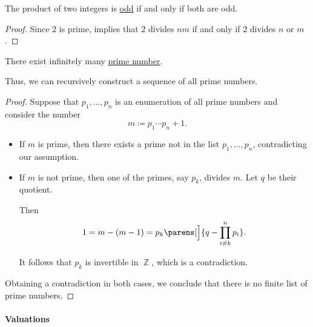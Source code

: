 \begin{corollary}\label{thm:integer_product_parity}
  The product of two integers is \hyperref[def:integer_parity]{odd} if and only if both are odd.
\end{corollary}
\begin{proof}
  Since \( 2 \) is prime,  implies that \( 2 \) divides \( nm \) if and only if \( 2 \) divides \( n \) or \( m \).
\end{proof}

\begin{theorem}\label{thm:euclids_prime_infinitude_theorem}
  There exist infinitely many \hyperref[def:prime_number]{prime number}.
\end{theorem}
\begin{comments}
  \item Thus, we can recursively construct a sequence of all prime numbers.
\end{comments}
\begin{proof}
  Suppose that \( p_1, \ldots, p_n \) is an enumeration of all prime numbers and consider the number
  \begin{equation*}
    m \coloneqq p_1 \cdots p_n + 1.
  \end{equation*}

  \begin{itemize}
    \item If \( m \) is prime, then there exists a prime not in the list \( p_1, \ldots, p_n \), contradicting our assumption.

    \item If \( m \) is not prime, then one of the primes, say \( p_k \), divides \( m \). Let \( q \) be their quotient.

    Then
    \begin{equation*}
      1 = m - (m - 1) = p_k \parens[\Big]{ q - \prod_{i \neq k}^n p_i }.
    \end{equation*}

    It follows that \( p_k \) is invertible in \( \BbbZ \), which is a contradiction.
  \end{itemize}

  Obtaining a contradiction in both cases, we conclude that there is no finite list of prime numbers.
\end{proof}

\paragraph{Valuations}

